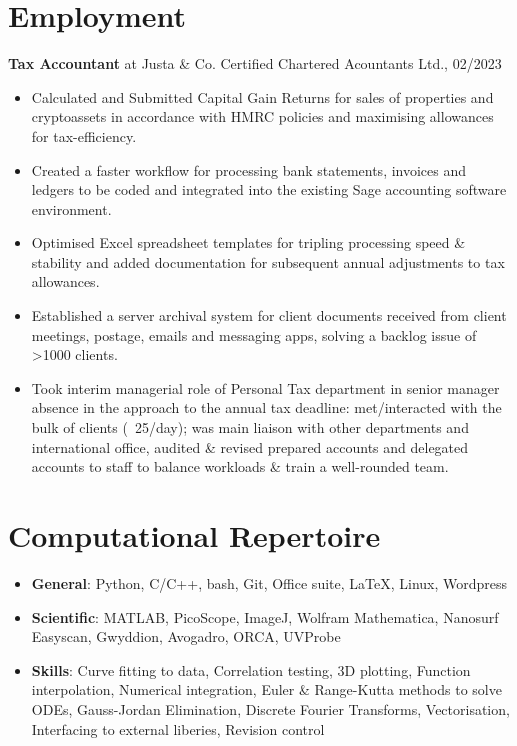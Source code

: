 \documentclass[a4paper]{article}
\begin{document}
\section{Employment}
\textbf{Tax Accountant} at  Justa \& Co. Certified Chartered Acountants Ltd., 02/2023

\begin{itemize}
	\item Calculated and Submitted Capital Gain Returns for sales of properties and cryptoassets in accordance with HMRC policies and maximising allowances for tax-efficiency.	
	\item Created a faster workflow for processing bank statements, invoices and ledgers to be coded and integrated into the existing Sage accounting software environment.
	\item Optimised Excel spreadsheet templates for tripling processing speed \& stability and added documentation for subsequent annual adjustments to tax allowances.
	\item Established a server archival system for client documents received from client meetings, postage, emails and messaging apps, solving a backlog issue of \textgreater1000 clients.
	\item Took interim managerial role of Personal Tax department in senior manager absence in the approach to the annual tax deadline: met/interacted with the bulk of clients (~25/day); was main liaison with other departments and international office, audited \& revised prepared accounts and delegated accounts to staff to balance workloads \& train a well-rounded team.
\end{itemize}



\section{Computational Repertoire}

\begin{itemize}
	\item \textbf{General}: Python, C/C++, bash, Git, Office suite, \LaTeX{}, Linux, Wordpress
	\item \textbf{Scientific}: MATLAB, PicoScope, ImageJ, Wolfram Mathematica, Nanosurf Easyscan, Gwyddion, Avogadro, ORCA, UVProbe
	\item \textbf{Skills}: Curve fitting to data, Correlation testing, 3D plotting, Function interpolation, Numerical integration, Euler \& Range-Kutta methods to solve ODEs, Gauss-Jordan Elimination, Discrete Fourier Transforms, Vectorisation, Interfacing to external liberies, Revision control
\end{itemize}
\end{document}
